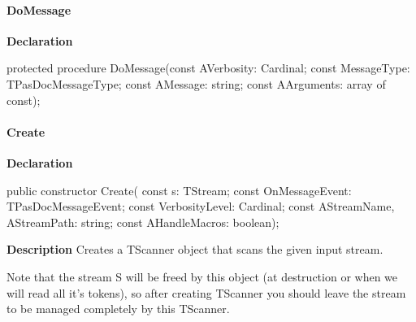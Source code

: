 \documentclass{report}
\newif\ifpdf
\begin{document}
\paragraph*{DoMessage}\hspace*{\fill}

\label{PasDoc_Scanner.TScanner-DoMessage}
\begin{list}{}{
\setlength{\itemindent}{0cm}
\setlength{\listparindent}{0cm}
\setlength{\leftmargin}{\evensidemargin}
\addtolength{\leftmargin}{\tmplength}
\settowidth{\labelsep}{X}
\addtolength{\leftmargin}{\labelsep}
\setlength{\labelwidth}{\tmplength}
}
\item[\textbf{Declaration}\hfill]
\ifpdf
\begin{flushleft}
\fi
\begin{ttfamily}
protected procedure DoMessage(const AVerbosity: Cardinal; const MessageType: TPasDocMessageType; const AMessage: string; const AArguments: array of const);\end{ttfamily}

\ifpdf
\end{flushleft}
\fi

\end{list}
\paragraph*{Create}\hspace*{\fill}

\label{PasDoc_Scanner.TScanner-Create}
\begin{list}{}{
\setlength{\itemindent}{0cm}
\setlength{\listparindent}{0cm}
\setlength{\leftmargin}{\evensidemargin}
\addtolength{\leftmargin}{\tmplength}
\settowidth{\labelsep}{X}
\addtolength{\leftmargin}{\labelsep}
\setlength{\labelwidth}{\tmplength}
}
\item[\textbf{Declaration}\hfill]
\ifpdf
\begin{flushleft}
\fi
\begin{ttfamily}
public constructor Create( const s: TStream; const OnMessageEvent: TPasDocMessageEvent; const VerbosityLevel: Cardinal; const AStreamName, AStreamPath: string; const AHandleMacros: boolean);\end{ttfamily}

\ifpdf
\end{flushleft}
\fi

\par
\item[\textbf{Description}]
Creates a TScanner object that scans the given input stream.

Note that the stream S will be freed by this object (at destruction or when we will read all it's tokens), so after creating TScanner you should leave the stream to be managed completely by this TScanner.

\end{list}
\end{document}
